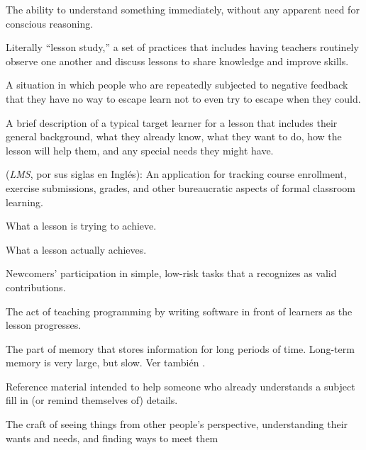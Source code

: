 \begin{description}
 The ability to understand something immediately,
without any apparent need for conscious reasoning.

 Literally ``lesson study,'' a set of
practices that includes having teachers routinely observe one another and
discuss lessons to share knowledge and improve skills.

 A situation in which
people who are repeatedly subjected to negative feedback that they have no way
to escape learn not to even try to escape when they could.

 A brief description of a typical
target learner for a lesson that includes their general background, what they
already know, what they want to do, how the lesson will help them, and any
special needs they might have.

 (\emph{LMS}, por sus siglas en Inglés): An application for tracking course
enrollment, exercise submissions, grades, and other bureaucratic aspects of
formal classroom learning.

 What a lesson is trying to
achieve.

 What a lesson actually achieves.

 Newcomers' participation in simple, low-risk tasks that a
 recognizes as valid contributions.

 The act of teaching programming by writing
software in front of learners as the lesson progresses.

 The part of memory that stores
information for long periods of time. Long-term memory is very large, but
slow. Ver también .

 Reference material intended to help someone who
already understands a subject fill in (or remind themselves of) details.

 The craft of seeing things from other people's
perspective, understanding their wants and needs, and finding ways to meet them


\end{description}
